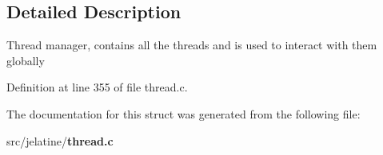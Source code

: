 \subsection{Detailed Description}
Thread manager, contains all the threads and is used to interact with them globally 

Definition at line 355 of file thread.c.



The documentation for this struct was generated from the following file:\begin{DoxyCompactItemize}
\item 
src/jelatine/{\bf thread.c}\end{DoxyCompactItemize}
